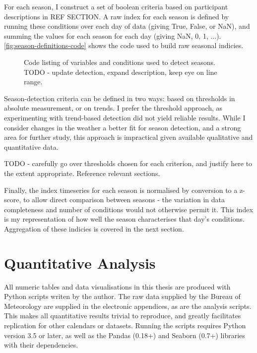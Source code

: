 For each season, I construct a set of boolean criteria based on participant
descriptions in REF SECTION.  A raw index for each season is defined by
running these conditions over each day of data (giving True, False, or NaN),
and summing the values for each season for each day (giving NaN, 0, 1, ...).
\autoref{fig:season-definitions-code} shows the code used to build raw
seasonal indicies.

\begin{figure}[h]
    
    \centering
    \caption[Python code: definition of season indicies]{
        Code listing of variables and conditions used to detect seasons.
        TODO - update detection, expand description, keep eye on line range.
        }
    \label{fig:season-definitions-code}
\end{figure}

Season-detection criteria can be defined in two ways: based on thresholds
in absolute measurement, or on trends.  I prefer the threshold approach,
as experimenting with trend-based detection did not yield reliable results.
While I consider changes in the weather a better fit for season detection,
and a strong area for further study, this approach is impractical given available
qualitative and quantitative data.

TODO - carefully go over thresholds chosen for each criterion, and
justify here to the extent appropriate.  Reference relevant sections.

Finally, the index timeseries for each season is normalised by conversion to
a z-score, to allow direct comparison between seasons - the variation in data
completeness and number of conditions would not otherwise permit it.
This index is my representation of how well the season characterises that day's
conditions.  Aggregation of these indicies is covered in the next section.



\section{Quantitative Analysis}

All numeric tables and data visualisations in this thesis are produced
with Python scripts writen by the author.  The raw data supplied by the
Bureau of Meteorology are supplied in the electronic appendices, as
are the analysis scripts.  This makes all quantitative results trivial
to reproduce, and greatly facilitates replication for other calendars
or datasets.  Running the scripts requires Python version 3.5 or later,
as well as the Pandas (0.18+) and Seaborn (0.7+) libraries with their
dependencies.

